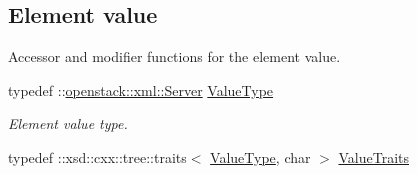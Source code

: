 \subsection*{Element value}
\label{_amgrp2ee2eae1a8c390ea033f241c027da8d6}
Accessor and modifier functions for the element value. \begin{DoxyCompactItemize}
\item 
\hypertarget{classopenstack_1_1xml_1_1Server___a3b6dd042ab9675a15ed65ad207b216ba}{
typedef ::\hyperlink{classopenstack_1_1xml_1_1Server}{openstack::xml::Server} \hyperlink{classopenstack_1_1xml_1_1Server___a3b6dd042ab9675a15ed65ad207b216ba}{ValueType}}
\label{classopenstack_1_1xml_1_1Server___a3b6dd042ab9675a15ed65ad207b216ba}

\begin{DoxyCompactList}\small\item\em Element value type. \item\end{DoxyCompactList}\item 
\hypertarget{classopenstack_1_1xml_1_1Server___ac0d601973ef35cd0588ef70eb4698d94}{
typedef ::xsd::cxx::tree::traits$<$ \hyperlink{classopenstack_1_1xml_1_1Server}{ValueType}, char $>$ \hyperlink{classopenstack_1_1xml_1_1Server___ac0d601973ef35cd0588ef70eb4698d94}{ValueTraits}}
\label{classopenstack_1_1xml_1_1Server___ac0d601973ef35cd0588ef70eb4698d94}


\end{DoxyCompactItemize}
